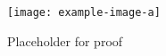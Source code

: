 \documentclass[10pt]{article}
\numberwithin{equation}{section}
\begin{document}
\begin{enumerate}
\begin{figure}[H]
    \centering
    \texttt{[image: example-image-a]}
    \caption{Placeholder for proof}
    \label{fig:sampleDonotuse}
\end{figure}

\vspace{50pt}

\end{enumerate}
\end{document}
